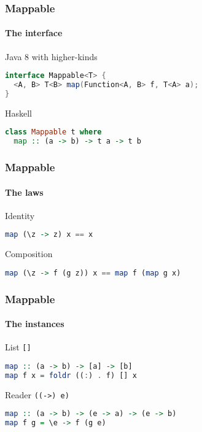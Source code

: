 \begin{frame}[fragile]
\frametitle{Mappable}
\framesubtitle{The interface}
\begin{block}{Java 8 with higher-kinds}
\begin{lstlisting}[style=language,language=java]
interface Mappable<T> {
  <A, B> T<B> map(Function<A, B> f, T<A> a);
}
\end{lstlisting}
\end{block}
\begin{block}{Haskell}
\begin{lstlisting}[style=language,language=haskell]
class Mappable t where
  map :: (a -> b) -> t a -> t b
\end{lstlisting}
\end{block}
\end{frame}

\begin{frame}[fragile]
\frametitle{Mappable}
\framesubtitle{The laws}
\begin{block}{Identity}
\begin{lstlisting}[style=language,language=haskell]
map (\z -> z) x == x
\end{lstlisting}
\end{block}
\begin{block}{Composition}
\begin{lstlisting}[style=language,language=haskell]
map (\z -> f (g z)) x == map f (map g x)
\end{lstlisting}
\end{block}
\end{frame}

\begin{frame}[fragile]
\frametitle{Mappable}
\framesubtitle{The instances}
\begin{block}{List \lstinline{[]}}
\begin{lstlisting}[style=language,language=haskell]
map :: (a -> b) -> [a] -> [b]
map f x = foldr ((:) . f) [] x
\end{lstlisting}
\end{block}
\begin{block}{Reader \lstinline{((->) e)}}
\begin{lstlisting}[style=language,language=haskell]
map :: (a -> b) -> (e -> a) -> (e -> b)
map f g = \e -> f (g e)
\end{lstlisting}
\end{block}
\end{frame}

